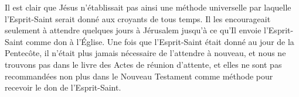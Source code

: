 Il est clair que Jésus n'établissait pas ainsi une méthode universelle par
 laquelle l'Esprit-Saint serait donné aux croyants de tous temps. Il les
 encourageait seulement à attendre quelques jours à Jérusalem jusqu'à ce
 qu'Il envoie l'Esprit-Saint comme don à l'Église. Une fois que
 l'Esprit-Saint était donné au jour de la Pentecôte, il n'était plus
 jamais nécessaire de l'attendre à nouveau, et nous ne trouvons pas dans
 le livre des Actes de réunion d'attente, et elles ne sont pas recommandées
 non plus dans le Nouveau Testament comme méthode pour recevoir le don de
 l'Esprit-Saint.


